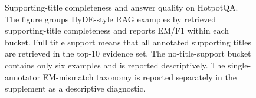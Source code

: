 \begin{figure}[t]
{%
}
\caption{Supporting-title completeness and answer quality on HotpotQA. The figure groups HyDE-style RAG examples by retrieved supporting-title completeness and reports EM/F1 within each bucket. Full title support means that all annotated supporting titles are retrieved in the top-10 evidence set. The no-title-support bucket contains only six examples and is reported descriptively. The single-annotator EM-mismatch taxonomy is reported separately in the supplement as a descriptive diagnostic.}
\label{fig:evidence_error_taxonomy}
\end{figure}
